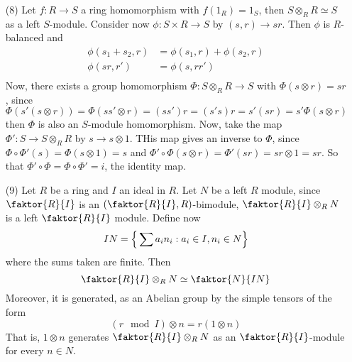 \begin{example}
\begin{enumerate}
        \item[(8)] Let $f:R \xrightarrow{} S$ a ring homomorphism with
            $f(1_R)=1_S$, then $S \otimes_R R \simeq S$ as a left  $S$-module.
            Consider now  $\phi:S \times R \xrightarrow{} S$ by $(s,r)
            \xrightarrow{} sr$. Then $\phi$ is  $R$-balanced and
            \begin{align*}
                \phi(s_1+s_2,r) &=  \phi(s_1,r)+\phi(s_2,r) \\
                \phi(sr,r') &=  \phi(s,rr') \\
            \end{align*}
            Now, there exists a group homomorphism $\Phi:S \otimes_R R
            \xrightarrow{} S$ with $\Phi(s \otimes r)=sr$, since
            \begin{equation*}
                \Phi(s'(s \otimes r))=\Phi(ss' \otimes
                r)=(ss')r=(s's)r=s'(sr)=s'\Phi(s \otimes r)
            \end{equation*}
            then $\Phi$ is also an $S$-module homomorphism. Now, take the map
            $\Phi':S \xrightarrow{} S \otimes_R R$ by $s \xrightarrow{} s
            \otimes 1$. THis map gives an inverse to $\Phi$, since  $\Phi \circ
            \Phi'(s)=\Phi(s \otimes 1)=s$ and $\Phi' \circ \Phi(s \otimes
            r)=\Phi'(sr)=sr \otimes 1=sr$. So that $\Phi' \circ \Phi=\Phi \circ
            \Phi'=i$, the identity map.

        \item[(9)] Let $R$ be a ring and  $I$ an ideal in  $R$. Let  $N$ be a
            left  $R$ module, since  $\faktor{R}{I}$ is an $(\faktor{R}{I},
            R)$-bimodule, $\faktor{R}{I} \otimes_R N$ is a left $\faktor{R}{I}$
            module. Define now
            \begin{equation*}
                IN=\Big{\{} \sum{a_in_i} : a_i \in I, n_i \in N \Big{\}}
            \end{equation*}
            where the sums taken are finite. Then
            \begin{equation*}
                \faktor{R}{I} \otimes_R N \simeq \faktor{N}{IN}
            \end{equation*}
            Moreover, it is generated, as an Abelian group by the simple tensors
            of the form
            \begin{equation*}
                (r \mod{I}) \otimes n=r(1 \otimes n)
            \end{equation*}
            That is, $1 \otimes n$ generates $\faktor{R}{I} \otimes_R N$ as an
            $\faktor{R}{I}$-module for every $n \in N$.


\end{enumerate}
\end{example}
